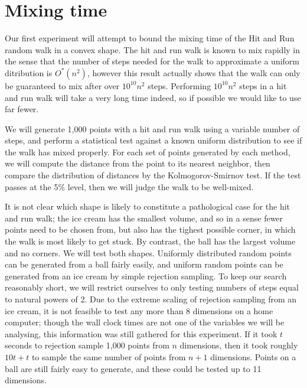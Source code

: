 \section{Mixing time}\label{sec_mix}

Our first experiment will attempt to bound the mixing time of the Hit and Run random walk in a convex shape. The hit and run walk is known to mix rapidly \cite{Lovasz98, Lovasz05} in the sense that the number of steps needed for the walk to approximate a uniform ditribution is $O^{*}(n^2)$, however this result actually shows that the walk can only be guaranteed to mix after over $10^{10} n^2$ steps. Performing $10^{10} n^2$ steps in a hit and run walk will take a very long time indeed, so if possible we would like to use far fewer.

We will generate 1,000 points with a hit and run walk using a variable number of steps, and perform a statistical test against a known uniform distribution to see if the walk has mixed properly. For each set of points generated by each method, we will compute the distance from the point to its nearest neighbor, then compare the distribution of distances by the Kolmogorov-Smirnov test. If the test passes at the 5\% level, then we will judge the walk to be well-mixed.

It is not clear which shape is likely to constitute a pathological case for the hit and run walk; the ice cream has the smallest volume, and so in a sense fewer points need to be chosen from, but also has the tighest possible corner, in which the walk is most likely to get stuck. By contrast, the ball has the largest volume and no corners. We will test both shapes. Uniformly distributed random points can be generated from a ball fairly easily, and uniform random points can be generated from an ice cream by simple rejection sampling. To keep our search reasonably short, we will restrict ourselves to only testing numbers of steps equal to natural powers of 2. Due to the extreme scaling of rejection sampling from an ice cream, it is not feasible to test any more than 8 dimensions on a home computer; though the wall clock times are not one of the variables we will be analysing, this information was still gathered for this experiment. If it took $t$ seconds to rejection sample 1,000 points from $n$ dimensions, then it took roughly $10t+t$ to sample the same number of points from $n+1$ dimensions. Points on a ball are still fairly easy to generate, and these could be tested up to 11 dimensions.

